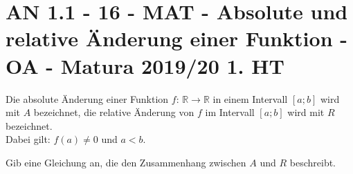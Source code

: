\section{AN 1.1 - 16 - MAT - Absolute und relative Änderung einer Funktion - OA - Matura 2019/20 1. HT}

\begin{beispiel}[AN 1.1]{1}
Die absolute Änderung einer Funktion $f$: $\mathbb{R}\rightarrow\mathbb{R}$ in einem Intervall $[a;b]$ wird mit $A$ bezeichnet, die relative Änderung von $f$ im Intervall $[a;b]$ wird mit $R$ bezeichnet.\\
Dabei gilt: $f(a)\neq 0$ und $a<b$.

Gib eine Gleichung an, die den Zusammenhang zwischen $A$ und $R$ beschreibt.

\end{beispiel}